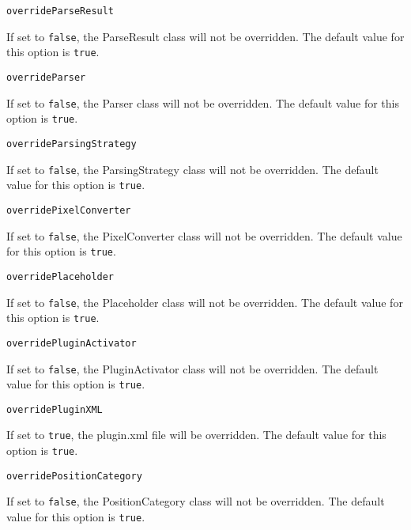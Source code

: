 \noindent\texttt{overrideParseResult}
\begin{myindentpar}{1cm}
If set to \texttt{false}, the ParseResult class will not be overridden. The default value for this option is \texttt{true}.
\end{myindentpar}

\noindent\texttt{overrideParser}
\begin{myindentpar}{1cm}
If set to \texttt{false}, the Parser class will not be overridden. The default value for this option is \texttt{true}.
\end{myindentpar}

\noindent\texttt{overrideParsingStrategy}
\begin{myindentpar}{1cm}
If set to \texttt{false}, the ParsingStrategy class will not be overridden. The default value for this option is \texttt{true}.
\end{myindentpar}

\noindent\texttt{overridePixelConverter}
\begin{myindentpar}{1cm}
If set to \texttt{false}, the PixelConverter class will not be overridden. The default value for this option is \texttt{true}.
\end{myindentpar}

\noindent\texttt{overridePlaceholder}
\begin{myindentpar}{1cm}
If set to \texttt{false}, the Placeholder class will not be overridden. The default value for this option is \texttt{true}.
\end{myindentpar}

\noindent\texttt{overridePluginActivator}
\begin{myindentpar}{1cm}
If set to \texttt{false}, the PluginActivator class will not be overridden. The default value for this option is \texttt{true}.
\end{myindentpar}

\noindent\texttt{overridePluginXML}
\begin{myindentpar}{1cm}
If set to \texttt{true}, the plugin.xml file will be overridden. The default value for this option is \texttt{true}.
\end{myindentpar}

\noindent\texttt{overridePositionCategory}
\begin{myindentpar}{1cm}
If set to \texttt{false}, the PositionCategory class will not be overridden. The default value for this option is \texttt{true}.
\end{myindentpar}

